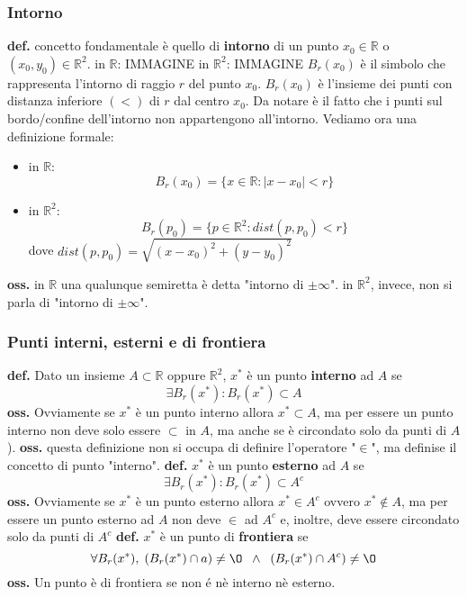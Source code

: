 \subsubsection*{Intorno}
\textbf{def.} concetto fondamentale è quello di \textbf{intorno} di un punto $x_0 \in \mathbb{R}$ o $(x_0,y_0) \in \mathbb{R}^2$.
\newline
in $\mathbb{R}$: IMMAGINE
\newline
in $\mathbb{R}^2$: IMMAGINE
\newline
$B_r(x_0)$ è il simbolo che rappresenta l'intorno di raggio $r$ del punto $x_0$.
\newline
$B_r(x_0)$ è l'insieme dei punti con distanza inferiore $(<)$ di $r$ dal centro $x_0$. Da notare è il fatto che i punti sul bordo/confine dell'intorno non appartengono all'intorno.
\newline
Vediamo ora una definizione formale:
\begin{itemize}
    \item in $\mathbb{R}$:
        \[
            B_r(x_0) = \{x\in\mathbb{R}:|x-x_0|<r\}
        \] 
    \item in $\mathbb{R}^2$: 
        \[
            B_r(p_0) = \{p\in\mathbb{R}^2:dist(p,p_0)<r\}
        \]
        dove $dist(p,p_0) = \sqrt{(x-x_0)^2+(y-y_0)^2}$
\end{itemize}
\textbf{oss.} in $\mathbb{R}$ una qualunque semiretta è detta "intorno di $\pm\infty$". in $\mathbb{R}^2$, invece, non si parla di "intorno di $\pm\infty$".
\subsubsection*{Punti interni, esterni e di frontiera}
\textbf{def.} Dato un insieme $A\subset \mathbb{R}$ oppure $\mathbb{R}^2$, $x^*$ è un punto \textbf{interno} ad $A$ se 
\[
    \exists B_r(x^*):B_r(x^*)\subset A
\] 
\textbf{oss.}  Ovviamente se $x^*$ è un punto interno allora $x^*\subset A$, ma per essere un punto interno non deve solo essere $\subset$ in $A$, ma anche se è circondato solo da punti di $A$).
\newline
\textbf{oss.}  questa definizione non si occupa di definire l'operatore "$\in$", ma definise il concetto di punto "interno".
\newline
\newline
\newline
\textbf{def.} $x^*$ è un punto \textbf{esterno} ad $A$ se
\[
    \exists B_r(x^*):B_r(x^*)\subset A^c
\] 
\textbf{oss.} Ovviamente se $x^*$ è un punto esterno allora $x^*\in A^c$ ovvero $x^*\notin A$, ma per essere un punto esterno ad $A$ non deve $\in$ ad $A^c$ e, inoltre, deve essere circondato solo da punti di $A^c$
\newline
\newline
\newline
\textbf{def.} $x^*$ è un punto di \textbf{frontiera} se
\[
    \forall B_r(x^*), \; (B_r(x^*) \cap a )\neq \O \;\;\land \;\; (B_r(x^*) \cap A^c) \neq \O
\] 
\textbf{oss.} Un punto è di frontiera se non é nè interno nè esterno.
\newline
\newline
